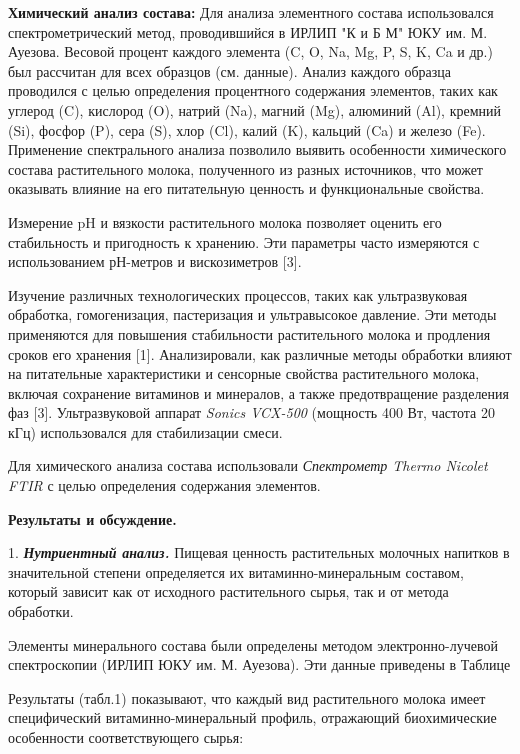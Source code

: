 \begin{multicols}{2}
{\bfseries Химический анализ состава:} Для анализа элементного состава
использовался спектрометрический метод, проводившийся в ИРЛИП "К и Б М"
ЮКУ им. М. Ауезова. Весовой процент каждого элемента (C, O, Na, Mg, P,
S, K, Ca и др.) был рассчитан для всех образцов (см. данные). Анализ
каждого образца проводился с целью определения процентного содержания
элементов, таких как углерод (C), кислород (O), натрий (Na), магний
(Mg), алюминий (Al), кремний (Si), фосфор (P), сера (S), хлор (Cl),
калий (K), кальций (Ca) и железо (Fe). Применение спектрального анализа
позволило выявить особенности химического состава растительного молока,
полученного из разных источников, что может оказывать влияние на его
питательную ценность и функциональные свойства.

Измерение pH и вязкости растительного молока позволяет оценить его
стабильность и пригодность к хранению. Эти параметры часто измеряются с
использованием рН-метров и вискозиметров {[}3{]}.

Изучение различных технологических процессов, таких как ультразвуковая
обработка, гомогенизация, пастеризация и ультравысокое давление. Эти
методы применяются для повышения стабильности растительного молока и
продления сроков его хранения {[}1{]}. Анализировали, как различные
методы обработки влияют на питательные характеристики и сенсорные
свойства растительного молока, включая сохранение витаминов и минералов,
а также предотвращение разделения фаз {[}3{]}. Ультразвуковой аппарат
\emph{Sonics VCX-500} (мощность 400 Вт, частота 20 кГц) использовался
для стабилизации смеси.

Для химического анализа состава использовали \emph{Спектрометр Thermo
Nicolet FTIR} с целью определения содержания элементов.

{\bfseries Результаты и обсуждение.}

1. \emph{{\bfseries Нутриентный анализ.}} Пищевая ценность растительных
молочных напитков в
значительной степени определяется их витаминно-минеральным составом,
который зависит как от исходного растительного сырья, так и от метода
обработки.

Элементы минерального состава были определены методом электронно-лучевой
спектроскопии (ИРЛИП ЮКУ им. М. Ауезова). Эти данные приведены в Таблице

Результаты (табл.1) показывают, что каждый вид растительного молока
имеет специфический витаминно-минеральный профиль, отражающий
биохимические особенности соответствующего сырья:


\end{multicols}
